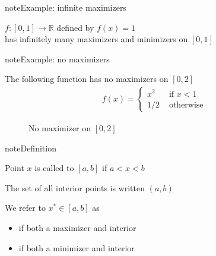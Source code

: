 \documentclass[letterpaper,10pt,english]{jupyterBook}
\begin{document}
\begin{sphinxadmonition}{note}{Example: infinite maximizers}

\sphinxAtStartPar
\(f \colon [0, 1] \to \mathbb{R}\) defined by \(f(x) =1\)\\
has infinitely many maximizers and minimizers on \([0, 1]\)
\end{sphinxadmonition}

\begin{sphinxadmonition}{note}{Example: no maximizers}

\sphinxAtStartPar
The following function has no maximizers on \([0, 2]\)
\begin{equation*}
\begin{split}
f(x) = 
\begin{cases}
x^2 &  \text{ if } x < 1
\\
1/2 &  \text{ otherwise}
\end{cases}
\end{split}
\end{equation*}
\begin{figure}[H]
\centering
\capstart

\noindent{}
\caption{No maximizer on \([0, 2]\)}\label{\detokenize{02.optimization_intro:id3}}\end{figure}
\end{sphinxadmonition}

\begin{sphinxadmonition}{note}{Definition}

\sphinxAtStartPar
Point  \(x\) is called  to \([a, b]\) if \(a < x < b\)
\end{sphinxadmonition}

\sphinxAtStartPar
The set of all interior points is written \((a, b)\)

\sphinxAtStartPar
We refer to \(x^* \in [a, b]\) as
\begin{itemize}
\item {} 
\sphinxAtStartPar
{} if both a maximizer and interior

\item {} 
\sphinxAtStartPar
{} if both a minimizer and interior

\end{itemize}
\end{document}
